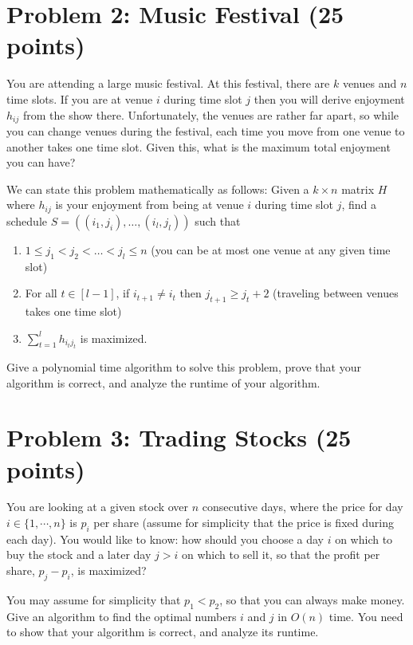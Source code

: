 \documentclass[12pt]{article}
\begin{document}
\vspace{5mm}
\section*{Problem 2: Music Festival (25 points)}
You are attending a large music festival. At this festival, there are $k$ venues and $n$ time slots. If you are at venue $i$ during time slot $j$ then you will derive enjoyment $h_{ij}$ from the show there. Unfortunately, the venues are rather far apart, so while you can change venues during the festival, each time you move from one venue to another takes one time slot. Given this, what is the maximum total enjoyment you can have?

We can state this problem mathematically as follows: Given a $k \times n$ matrix $H$ where $h_{ij}$ is your enjoyment from being at venue $i$ during time slot $j$, find a schedule $S = ((i_1,j_i),\ldots,(i_l,j_l))$ such that 
\begin{enumerate}
\item $1 \leq j_1 < j_2 < \ldots < j_l \leq n$ (you can be at most one venue at any given time slot)
\item For all $t \in [l-1]$, if $i_{t+1} \neq i_{t}$ then $j_{t+1} \geq j_{t} + 2$ (traveling between venues takes one time slot)
\item $\sum_{t=1}^{l}{h_{{i_t}{j_t}}}$ is maximized.
\end{enumerate}
Give a polynomial time algorithm to solve this problem, prove that your algorithm is correct, and analyze the runtime of your algorithm.



\vspace{5mm}
\section*{Problem 3: Trading Stocks (25 points)}
You are looking at a given stock over $n$ consecutive days, where the price for day $i \in \{1, \cdots, n\}$ is $p_i$ per share (assume for simplicity that the price is fixed during each day). You would like
to know: how should you choose a day $i$ on which to buy the stock and a
later day $j > i$ on which to sell it, so that the profit per share, $p_j - p_i$, is maximized? 

You may assume for simplicity that $p_1 < p_2$, so that you can always make money. 
Give an algorithm to find the optimal numbers $i$ and $j$ in $O(n)$ time.
You need to show that your algorithm is correct, and analyze its runtime. 
\end{document}
